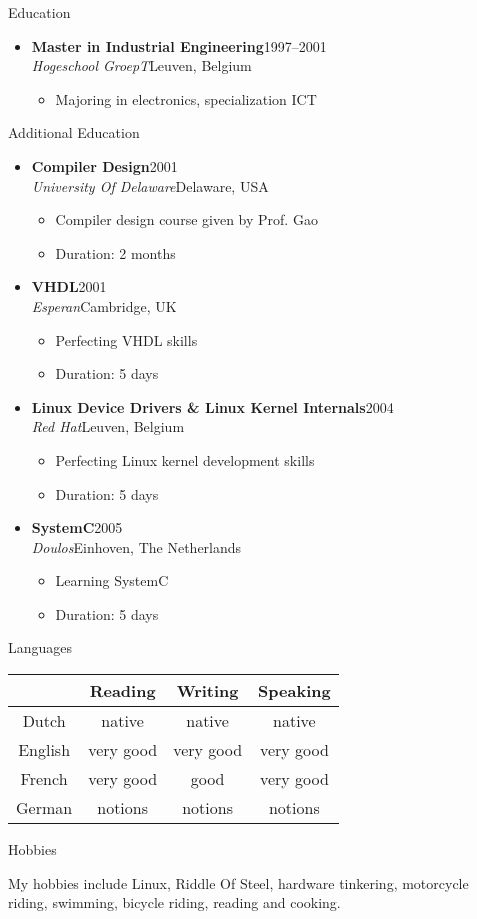 \documentclass[12pt,oneside]{article}
\makeatletter
\newenvironment{ressection}[1]{
	\vspace{5pt}
	{\selectfont\Large#1}
	\begin{itemize}
	\vspace{5pt}
}{
	\end{itemize}
}
\newenvironment{hobbies}{
	\vspace{5pt}
	{\selectfont\Large Hobbies}
	\vspace{5pt}
	\begin{flushleft}
}{
	\end{flushleft}
	\vspace{5pt}
}
\newcommand{\ressubitem}[1]{
	\vspace{-4pt}
	\item \begin{flushleft} #1 \end{flushleft}
}
\newcommand{\resbigitem}[4]{
	\vspace{-5pt}
	\item
	\textbf{#1}\hfill#4 \\
	\textit{#2}\hfill#3
}
\newenvironment{ressubsec}[4]{
	\resbigitem{#1}{#2}{#3}{#4}
	\vspace{-2pt}
	\begin{itemize}
}{
	\end{itemize}
}
\newcommand{\langhdr}{
& Reading & Writing & Speaking \\
}
\newcommand{\lang}[4]{
#1 & #2 & #3 & #4 \\
}
\newenvironment{languages}{
	\vspace{5pt}
	\begin{minipage}{\textwidth}
	{\selectfont\Large Languages} \\
	\begin{center}
	\begin{tabular*}{0.75\textwidth}{@{\extracolsep{\fill}}cccc}
	\langhdr
	\hline
}{
	\end{tabular*}
	\end{center}
	\end{minipage}
	\vspace{5pt}
}
\makeatother
\begin{document}
\begin{ressection}{Education}
	\begin{ressubsec}{Master in Industrial Engineering}{Hogeschool GroepT}{Leuven, Belgium}{1997--2001}
		\ressubitem{Majoring in electronics, specialization ICT}
	\end{ressubsec}
\end{ressection}

\begin{ressection}{Additional Education}
	\begin{ressubsec}{Compiler Design}{University Of Delaware}{Delaware, USA}{2001}
		\ressubitem{Compiler design course given by Prof. Gao}
		\ressubitem{Duration: 2 months}
	\end{ressubsec}
	\begin{ressubsec}{VHDL}{Esperan}{Cambridge, UK}{2001}
		\ressubitem{Perfecting VHDL skills}
		\ressubitem{Duration: 5 days}
	\end{ressubsec}
	\begin{ressubsec}{Linux Device Drivers \& Linux Kernel Internals}{Red Hat}{Leuven, Belgium}{2004}
		\ressubitem{Perfecting Linux kernel development skills}
		\ressubitem{Duration: 5 days}
	\end{ressubsec}
	\begin{ressubsec}{SystemC}{Doulos}{Einhoven, The Netherlands}{2005}
		\ressubitem{Learning SystemC}
		\ressubitem{Duration: 5 days}
	\end{ressubsec}
\end{ressection}

\begin{languages}
\lang{Dutch}{native}{native}{native}
\lang{English}{very good}{very good}{very good}
\lang{French}{very good}{good}{very good}
\lang{German}{notions}{notions}{notions}
\end{languages}

\begin{hobbies}
My hobbies include Linux, Riddle Of Steel, hardware tinkering,
motorcycle riding, swimming, bicycle riding, reading and cooking.
\end{hobbies}
\end{document}

